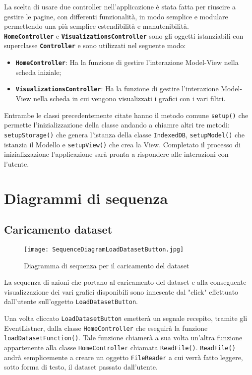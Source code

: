 La scelta di usare due controller nell'applicazione è stata fatta per riuscire a gestire le pagine, con differenti funzionalità, in modo semplice e modulare permettendo una più semplice estendibilità e manutenibilità.\\
\textbf{\texttt{HomeController}} e \textbf{\texttt{VisualizationsController}} sono gli oggetti istanziabili con superclasse \textbf{\texttt{Controller}} e sono utilizzati nel seguente modo:
\begin{itemize}
	\item \textbf{\texttt{HomeController}}: Ha la funzione di gestire l'interazione Model-View nella scheda iniziale;
	\item \textbf{\texttt{VisualizationsController}}: Ha la funzione di gestire l'interazione Model-View nella scheda in cui vengono visualizzati i grafici con i vari filtri.
\end{itemize}
Entrambe le classi precedentemente citate hanno il metodo comune \texttt{setup()} che permette l'inizializzazione della classe andando a chiamre altri tre metodi: \texttt{setupStorage()} che genera l'istanza della classe \texttt{IndexedDB}, \texttt{setupModel()} che istanzia il Modello e \texttt{setupView()} che crea la View. Completato il processo di inizializzazione l'applicazione sarà pronta a rispondere alle interazioni con l'utente.

\section{Diagrammi di sequenza}
\subsection{Caricamento dataset}
\begin{figure}[H]
	\centering
	\texttt{[image: SequenceDiagramLoadDatasetButton.jpg]}
	\caption{Diagramma di sequenza per il caricamento del dataset}
  \end{figure}
  La sequenza di azioni che portano al caricamento del dataset e alla conseguente visualizzazione dei vari grafici disponibili sono innescate dal "click" effettuato dall'utente sull'oggetto \texttt{LoadDatasetButton}.

Una volta cliccato \texttt{LoadDatasetButton} emetterà un segnale recepito, tramite gli EventListner, dalla classe \texttt{HomeController} che eseguirà la funzione\\ \texttt{loadDatasetFunction()}. Tale funzione chiamerà a sua volta un'altra funzione appartenente alla classe \texttt{HomeController} chiamata \texttt{ReadFile()}.
\texttt{ReadFile()} andrà semplicemente a creare un oggetto \texttt{FileReader} a cui verrà fatto leggere, sotto forma di testo, il dataset passato dall'utente.

